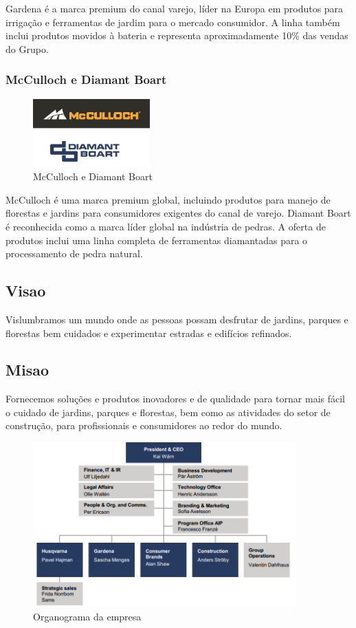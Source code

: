 \documentclass[12pt]{article}
\begin{document}
	Gardena é a marca premium do canal varejo, líder na Europa em produtos para irrigação e ferramentas de jardim para o mercado consumidor. A linha também inclui produtos movidos à bateria e representa aproximadamente 10\% das vendas do Grupo.

\subsubsection{McCulloch e Diamant Boart}

\begin{figure}[h!]
	\centering
	\includegraphics[width=0.4\textwidth]{img/logo-mcdb.png}
	\caption{McCulloch e Diamant Boart}
\end{figure}

	McCulloch é uma marca premium global, incluindo produtos para manejo de florestas e jardins para consumidores exigentes do canal de varejo. Diamant Boart é reconhecida como a marca líder global na indústria de pedras. A oferta de produtos inclui uma linha completa de ferramentas diamantadas para o processamento de pedra natural.	

\subsection{Visao}
	Vislumbramos um mundo onde as pessoas possam desfrutar de jardins, parques e florestas bem cuidados e experimentar estradas e edifícios refinados.

\subsection{Misao}
	Fornecemos soluções e produtos inovadores e de qualidade para tornar mais fácil o cuidado de jardins, parques e florestas, bem como as atividades do setor de construção, para profissionais e consumidores ao redor do mundo.

\begin{figure}[h!]
	\centering
	\includegraphics[width=0.9\textwidth]{img/organograma.png}
	\caption{Organograma da empresa}
	\label{organograma}
\end{figure}
\end{document}
